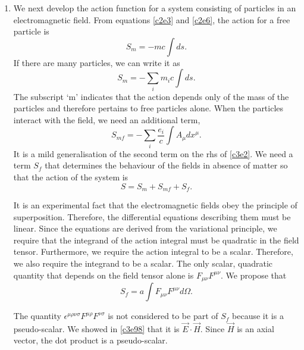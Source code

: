 \begin{enumerate}
\item We next develop the action function for a system consisting of particles
in an electromagnetic field. From equations \eqref{c2e3} and \eqref{c2e6}, the
action for a free particle is
\begin{equation}\label{c4e8}
S_m = -mc\int ds.
\end{equation}
If there are many particles, we can write it as
\begin{equation}\label{c4e9}
S_m = -\sum_i m_ic\int ds.
\end{equation}
The subscript `m' indicates that the action depends only of the mass of the 
particles and therefore pertains to free particles alone. When the particles
interact with the field, we need an additional term,
\begin{equation}\label{c4e10}
S_{mf} = -\sum_i \frac{e_i}{c}\int A_\mu dx^\mu.
\end{equation}
It is a mild generalisation of the second term on the rhs of \eqref{c3e2}.
We need a term $S_f$ that determines the behaviour of the fields in absence of
matter so that the action of the system is
\begin{equation}\label{c4e11}
S = S_m + S_{mf} + S_f.
\end{equation}

It is an experimental fact that the electromagnetic fields obey the principle of
superposition. Therefore, the differential equations describing them must be linear.
Since the equations are derived from the variational principle, we require that the
integrand of the action integral must be quadratic in the field tensor. Furthermore,
we require the action integral to be a scalar. Therefore, we also require the 
integrand to be a scalar. The only scalar, quadratic quantity that depends on the
field tensor alone is $F_{\mu\nu}F^{\mu\nu}$. We propose that
\begin{equation}\label{c4e12}
S_f = a\int F_{\mu\nu}F^{\mu\nu} d\Omega.
\end{equation}

The quantity $\epsilon^{\mu\rho\nu\sigma}F^{\mu\rho}F^{\nu\sigma}$ is not 
considered to be part of $S_f$ because it is a pseudo-scalar. We showed in 
\eqref{c3e98} that it is $\vec{E}\cdot\vec{H}$. Since $\vec{H}$ is an axial vector,
the dot product is a pseudo-scalar.


\end{enumerate}
